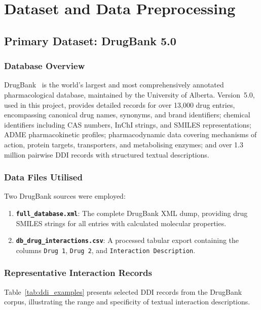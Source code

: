 \documentclass[12pt,a4paper,oneside]{report}
\begin{document}
\chapter{Dataset and Data Preprocessing}
\label{chap:data}

\section{Primary Dataset: DrugBank 5.0}

\subsection{Database Overview}

DrugBank~\cite{wishart2018drugbank} is the world's largest and most comprehensively annotated
pharmacological database, maintained by the University of Alberta. Version~5.0, used in this
project, provides detailed records for over 13,000 drug entries, encompassing canonical drug
names, synonyms, and brand identifiers; chemical identifiers including CAS numbers, InChI
strings, and SMILES representations; ADME pharmacokinetic profiles; pharmacodynamic data
covering mechanisms of action, protein targets, transporters, and metabolising enzymes;
and over 1.3 million pairwise DDI records with structured textual descriptions.

\subsection{Data Files Utilised}

Two DrugBank sources were employed:

\begin{enumerate}
  \item \textbf{\texttt{full\_database.xml}}: The complete DrugBank XML dump, providing drug
  SMILES strings for all entries with calculated molecular properties.
  \item \textbf{\texttt{db\_drug\_interactions.csv}}: A processed tabular export containing
  the columns \texttt{Drug\,1}, \texttt{Drug\,2}, and \texttt{Interaction Description}.
\end{enumerate}

\subsection{Representative Interaction Records}

Table~\ref{tab:ddi_examples} presents selected DDI records from the DrugBank corpus,
illustrating the range and specificity of textual interaction descriptions.
\end{document}
